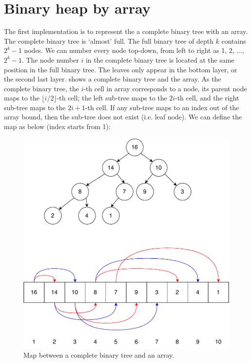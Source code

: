 \documentclass[b5paper]{article}
\begin{document}
\section{Binary heap by array}
\label{ibheap}  

The first implementation is to represent the a complete binary tree with an array. The complete binary tree is `almost' full. The full binary tree of depth $k$ contains $2^k - 1$ nodes. We can number every node top-down, from left to right as 1, 2, ..., $2^k -1$. The node number $i$ in the complete binary tree is located at the same position in the full binary tree. The leaves only appear in the bottom layer, or the second last layer.  shows a complete binary tree and the array. As the complete binary tree, the $i$-th cell in array corresponds to a node, its parent node maps to the $\lfloor i/2 \rfloor$-th cell; the left sub-tree maps to the $2i$-th cell, and the right sub-tree maps to the $2i + 1$-th cell. If any sub-tree maps to an index out of the array bound, then the sub-tree does not exist (i.e. leaf node). We can define the map as below (index starts from 1):

\begin{figure}[htbp]
\centering
   \includegraphics[scale=0.5]{img/binary-tree-in-array}
 \caption{Map between a complete binary tree and an array.} \label{fig:tree-array-map}
\end{figure}
\end{document}
